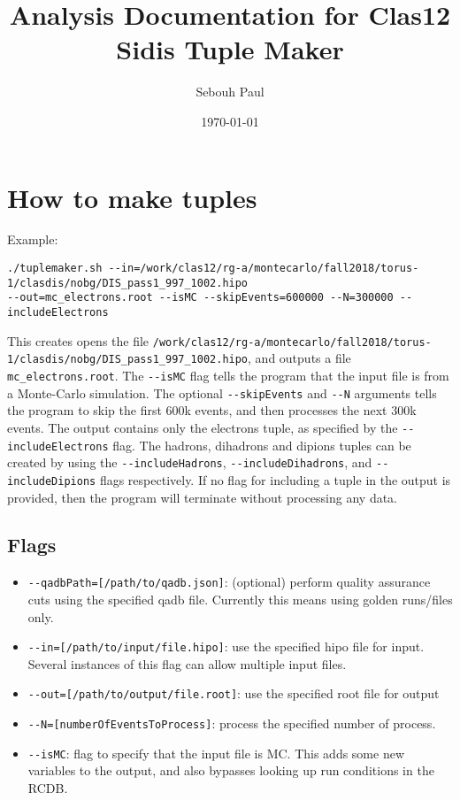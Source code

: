 \documentclass[english]{article}
\newcommand{\code}[1]{\texttt{#1}}
\begin{document}
\title{
Analysis Documentation for Clas12 Sidis Tuple Maker
}

\author{Sebouh Paul}
\date{\today}

\maketitle
\tableofcontents
\newpage

\section{How to make tuples}
Example:\\
\begin{verbatim}
./tuplemaker.sh --in=/work/clas12/rg-a/montecarlo/fall2018/torus-1/clasdis/nobg/DIS_pass1_997_1002.hipo
--out=mc_electrons.root --isMC --skipEvents=600000 --N=300000 --includeElectrons
 \end{verbatim}

This creates opens the file \code{/work/clas12/rg-a/montecarlo/fall2018/torus-1/clasdis/nobg/DIS\_pass1\_997\_1002.hipo}, and outputs a file \code{mc\_electrons.root}.  The \code{-{}-isMC} flag tells the program that the input file is from a Monte-Carlo simulation.  The optional \code{-{}-skipEvents} and \code{-{}-N} arguments tells the program to skip the first 600k events, and then processes the next 300k events.  The output contains only the electrons tuple, as specified by the \code{-{}-includeElectrons} flag.  The hadrons, dihadrons and dipions tuples can be created by using the \code{-{}-includeHadrons}, \code{-{}-includeDihadrons}, and \code{-{}-includeDipions} flags respectively.  If no flag for including a tuple in the output is provided, then the program will terminate without processing any data.  
 
 \subsection{Flags}
\begin{itemize}
\item \code{-{}-qadbPath=[/path/to/qadb.json]}: (optional) perform quality assurance cuts using the specified qadb file.  Currently this means using golden runs/files only.  
\item \code{-{}-in=[/path/to/input/file.hipo]}: use the specified hipo file for input.  Several instances of this flag can allow multiple input files.
\item \code{-{}-out=[/path/to/output/file.root]}: use the specified root file for output
\item \code{-{}-N=[numberOfEventsToProcess]}:  process the specified number of process.  
\item \code{-{}-isMC}: flag to specify that the input file is MC.  This adds some new variables to the output, and also bypasses looking up run conditions in the RCDB.  
\end{itemize}
\end{document}
